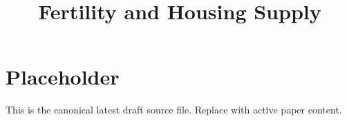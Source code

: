 \documentclass[11pt]{article}
\title{Fertility and Housing Supply}
\author{}
\date{}
\begin{document}
\maketitle

\section{Placeholder}
This is the canonical latest draft source file. Replace with active paper content.
\end{document}
